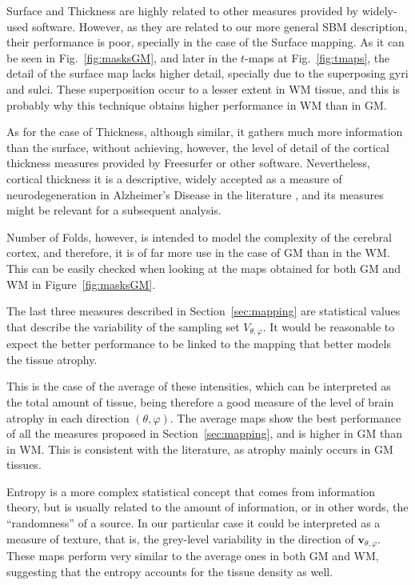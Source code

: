 Surface and Thickness are highly related to other measures provided by widely-used software. However, as they are related to our more general \ac{SBM} description, their performance is poor, specially in the case of the Surface mapping. As it can be seen in Fig.~\ref{fig:masksGM}, and later in the $t$-maps at Fig.~\ref{fig:tmaps}, the detail of the surface map lacks higher detail, specially due to the superposing gyri and sulci. These superposition occur to a lesser extent in \ac{WM} tissue, and this is probably why this technique obtains higher performance in \ac{WM} than in \ac{GM}. 

As for the case of Thickness, although similar, it gathers much more information than the surface, without achieving, however, the level of detail of the cortical thickness measures provided by Freesurfer \cite{Fischl2004} or other software. Nevertheless, cortical thickness it is a descriptive, widely accepted as a measure of neurodegeneration in Alzheimer's Disease in the literature \cite{han2006reliability,Fischl2004}, and its measures might be relevant for a subsequent analysis. 

Number of Folds, however, is intended to model the complexity of the cerebral cortex, and therefore, it is of far more use in the case of \ac{GM} than in the \ac{WM}. This can be easily checked when looking at the maps obtained for both \ac{GM} and \ac{WM} in Figure~\ref{fig:masksGM}. 

The last three measures described in Section~\ref{sec:mapping} are statistical values that describe the variability of the sampling set $V_{\theta,\varphi}$. It would be reasonable to expect the better performance to be linked to the mapping that better models the tissue atrophy. 

This is the case of the average of these intensities, which can be interpreted as the total amount of tissue, being therefore a good measure of the level of brain atrophy in each direction $(\theta,\varphi)$. The average maps show the best performance of all the measures proposed in Section~\ref{sec:mapping}, and is higher in \ac{GM} than in \ac{WM}. This is consistent with the literature, as atrophy mainly occurs in \ac{GM} tissues. 

Entropy is a more complex statistical concept that comes from information theory, but is usually related to the amount of information, or in other words, the ``randomness'' of a source. In our particular case it could be interpreted as a measure of texture, that is, the grey-level variability in the direction of $\mathbf{v}_{\theta,\varphi}$. These maps perform very similar to the average ones in both \ac{GM} and \ac{WM}, suggesting that the entropy accounts for the tissue density as well. 

